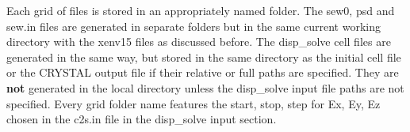 Each grid of files is stored in an appropriately named folder. The sew0, psd and sew.in files are generated in separate folders but in the same current working directory with the xenv15 files as discussed before.
The disp\_solve cell files are generated in the same way, but stored in the same directory as the initial cell file or the CRYSTAL output file if their relative or full paths are specified.
They are \textbf{not} generated in the local directory unless the disp\_solve input file paths are not specified. Every grid folder name features the start, stop, step for Ex, Ey, Ez chosen in the c2s.in file in the disp\_solve input section.